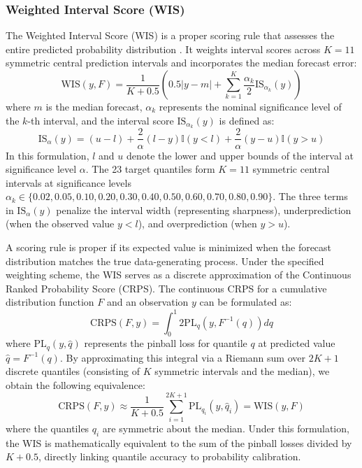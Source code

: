 \subsubsection{Weighted Interval Score (WIS)}
The Weighted Interval Score (WIS) is a proper scoring rule that assesses the entire predicted probability distribution \cite{bracher2021evaluating}. It weights interval scores across $K=11$ symmetric central prediction intervals and incorporates the median forecast error:
\begin{equation}
\text{WIS}(y, F) = \frac{1}{K+0.5} \left( 0.5|y - m| + \sum_{k=1}^K \frac{\alpha_k}{2} \text{IS}_{\alpha_k}(y) \right)
\end{equation}
where $m$ is the median forecast, $\alpha_k$ represents the nominal significance level of the $k$-th interval, and the interval score $\text{IS}_{\alpha_k}(y)$ is defined as:
\begin{equation}
\text{IS}_\alpha(y) = (u - l) + \frac{2}{\alpha}(l - y)\mathbb{I}(y < l) + \frac{2}{\alpha}(y - u)\mathbb{I}(y > u)
\end{equation}
In this formulation, $l$ and $u$ denote the lower and upper bounds of the interval at significance level $\alpha$. The 23 target quantiles form $K=11$ symmetric central intervals at significance levels $\alpha_k \in \{0.02, 0.05, 0.10, 0.20, 0.30, 0.40, 0.50, 0.60, 0.70, 0.80, 0.90\}$. The three terms in $\text{IS}_{\alpha}(y)$ penalize the interval width (representing sharpness), underprediction (when the observed value $y < l$), and overprediction (when $y > u$).

A scoring rule is proper if its expected value is minimized when the forecast distribution matches the true data-generating process. Under the specified weighting scheme, the WIS serves as a discrete approximation of the Continuous Ranked Probability Score (CRPS). The continuous CRPS for a cumulative distribution function $F$ and an observation $y$ can be formulated as:
\begin{equation}
\text{CRPS}(F, y) = \int_0^1 2 \text{PL}_q(y, F^{-1}(q)) dq
\end{equation}
where $\text{PL}_q(y, \hat{q})$ represents the pinball loss for quantile $q$ at predicted value $\hat{q} = F^{-1}(q)$. By approximating this integral via a Riemann sum over $2K+1$ discrete quantiles (consisting of $K$ symmetric intervals and the median), we obtain the following equivalence:
\begin{equation}
\text{CRPS}(F, y) \approx \frac{1}{K+0.5} \sum_{i=1}^{2K+1} \text{PL}_{q_i}(y, \hat{q}_i) = \text{WIS}(y, F)
\end{equation}
where the quantiles $q_i$ are symmetric about the median. Under this formulation, the WIS is mathematically equivalent to the sum of the pinball losses divided by $K+0.5$, directly linking quantile accuracy to probability calibration.

